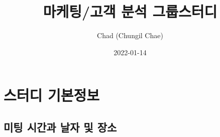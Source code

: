 \documentclass[
]{book}
\title{마케팅/고객 분석 그룹스터디}
\author{Chad (Chungil Chae)}
\date{2022-01-14}
\begin{document}
\maketitle

{
\setcounter{tocdepth}{1}
\tableofcontents
}
\hypertarget{uxc2a4uxd130uxb514-uxae30uxbcf8uxc815uxbcf4}{%
\chapter{스터디 기본정보}\label{uxc2a4uxd130uxb514-uxae30uxbcf8uxc815uxbcf4}}

\hypertarget{uxbbf8uxd305-uxc2dcuxac04uxacfc-uxb0a0uxc790-uxbc0f-uxc7a5uxc18c}{%
\section{미팅 시간과 날자 및 장소}\label{uxbbf8uxd305-uxc2dcuxac04uxacfc-uxb0a0uxc790-uxbc0f-uxc7a5uxc18c}}
\end{document}
